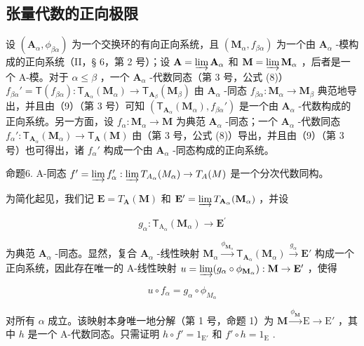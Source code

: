\subsection{张量代数的正向极限}

设 \((\mathbf{A}_{\alpha},\phi_{\beta \alpha})\) 为一个交换环的有向正向系统，且 \((\mathbf{M}_{\alpha},f_{\beta \alpha})\) 为一个由 \(\mathbf{A}_{\alpha}\) -模构成的正向系统（II，§ 6，第 2 号）；设 \(\mathbf{A} = \varinjlim \mathbf{A}_{\alpha}\) 和 \(\mathbf{M} = \varinjlim \mathbf{M}_{\alpha}\) ，后者是一个 A-模。对于 \(\alpha \leqslant \beta\) ，一个 \(\mathbf{A}_{\alpha}\) -代数同态（第 3 号，公式 (8)） \(f_{\beta \alpha}' = \mathsf{T}(f_{\beta \alpha})\colon \mathsf{T}_{\mathbf{A}_{\alpha}}(\mathbf{M}_{\alpha})\to \mathsf{T}_{\mathbf{A}_{\beta}}(\mathbf{M}_{\beta})\) 由 \(\mathbf{A}_{\alpha}\) -同态 \(f_{\beta \alpha}\colon \mathbf{M}_{\alpha}\to \mathbf{M}_{\beta}\) 典范地导出，并且由（9）（第 3 号）可知 \((\mathsf{T}_{\mathbf{A}_{\alpha}}(\mathbf{M}_{\alpha}),f_{\beta \alpha}')\) 是一个由 \(\mathbf{A}_{\alpha}\) -代数构成的正向系统。另一方面，设 \(f_{\alpha}\colon \mathbf{M}_{\alpha}\to \mathbf{M}\) 为典范 \(\mathbf{A}_{\alpha}\) -同态；一个 \(\mathbf{A}_{\alpha}\) -代数同态 \(f_{\alpha}'\colon \mathsf{T}_{\mathbf{A}_{\alpha}}(\mathbf{M}_{\alpha})\to \mathsf{T}_{\mathbf{A}}(\mathbf{M})\) 由（第 3 号，公式 (8)）导出，并且由（9）（第 3 号）也可得出，诸 \(f_{\alpha}'\) 构成一个由 \(\mathbf{A}_{\alpha}\) -同态构成的正向系统。

命题6. A-同态 \(f' = \varinjlim f_{\alpha}' : \varinjlim T_{A_{\alpha}}(M_{\alpha}) \to T_{A}(M)\) 是一个分次代数同构。

为简化起见，我们记 \(\mathbf{E} = T_{\mathbf{A}}(\mathbf{M})\) 和 \(\mathbf{E}' = \varinjlim T_{\mathbf{A}_{\alpha}}(\mathbf{M}_{\alpha})\) ，并设

\[
g _ {\alpha}: \mathsf {T} _ {\mathrm{A} _ {\alpha}} (\mathbf {M} _ {\alpha}) \rightarrow \mathbf {E} ^ {\prime}
\]

为典范 \(\mathbf{A}_{\alpha}\) -同态。显然，复合 \(\mathbf{A}_{\alpha}\) -线性映射 \(\mathbf{M}_{\alpha} \xrightarrow{\phi_{\mathbf{M}_{\alpha}}} \mathsf{T}_{\mathbf{A}_{\alpha}}(\mathbf{M}_{\alpha}) \xrightarrow{g_{\alpha}} \mathbf{E}'\) 构成一个正向系统，因此存在唯一的 A-线性映射 \(u = \varinjlim (g_{\alpha} \circ \phi_{\mathbf{M}_{\alpha}}): \mathbf{M} \to \mathbf{E}'\) ，使得

\[
u \circ f _ {\alpha} = g _ {\alpha} \circ \phi_ {M _ {\alpha}}
\]

对所有 \(\alpha\) 成立。该映射本身唯一地分解（第 1 号，命题 1）为 \(\mathbf{M} \xrightarrow{\phi_{\mathbf{M}}} \mathrm{E} \to \mathrm{E}'\) ，其中 \(h\) 是一个 A-代数同态。只需证明 \(h \circ f' = 1_{\mathrm{E}'}\) 和 \(f' \circ h = 1_{\mathrm{E}}\) .

